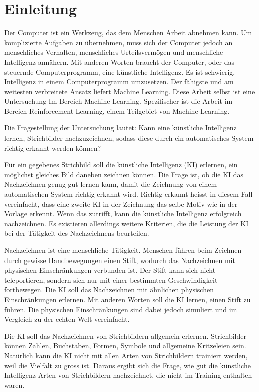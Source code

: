 \chapter{Einleitung}\label{chap:einleit}
Der Computer ist ein Werkzeug, das dem Menschen Arbeit abnehmen kann. Um
komplizierte Aufgaben zu übernehmen, muss sich der Computer jedoch an
menschliches Verhalten, menschliches Urteilsvermögen und menschliche Intelligenz
annähern. Mit anderen Worten braucht der Computer, oder das steuernde
Computerprogramm, eine künstliche Intelligenz. Es ist schwierig, Intelligenz in
einem Computerprogramm umzusetzen. Der fähigste und am weitesten verbreitete
Ansatz liefert Machine Learning. Diese Arbeit selbst ist eine Untersuchung Im
Bereich Machine Learning. Spezifischer ist die Arbeit im Bereich Reinforcement
Learning, einem Teilgebiet von Machine Learning.

Die Fragestellung der Untersuchung lautet: Kann eine künstliche Intelligenz
lernen, Strichbilder nachzuzeichnen, sodass diese durch ein automatisches System
richtig erkannt werden können?

Für ein gegebenes Strichbild soll die künstliche Intelligenz (KI) erlernen, ein
möglichst gleiches Bild daneben zeichnen können. Die Frage ist, ob die KI das
Nachzeichnen genug gut lernen kann, damit die Zeichnung von einem automatischen
System richtig erkannt wird. Richtig erkannt heisst in diesem Fall vereinfacht,
dass eine zweite KI in der Zeichnung das selbe Motiv wie in der Vorlage erkennt.
Wenn das zutrifft, kann die künstliche Intelligenz erfolgreich nachzeichnen. Es
existieren allerdings weitere Kriterien, die die Leistung der KI bei der
Tätigkeit des Nachzeichnens beurteilen.

Nachzeichnen ist eine menschliche Tätigkeit. Menschen führen beim Zeichnen durch
gewisse Handbewegungen einen Stift, wodurch das Nachzeichnen mit physischen
Einschränkungen verbunden ist. Der Stift kann sich nicht teleportieren, sondern
sich nur mit einer bestimmten Geschwindigkeit fortbewegen. Die KI soll das
Nachzeichnen mit ähnlichen physischen Einschränkungen erlernen. Mit anderen
Worten soll die KI lernen, einen Stift zu führen.  Die
physischen Einschränkungen sind dabei jedoch simuliert und im Vergleich zu der
echten Welt vereinfacht. 

Die KI soll das Nachzeichnen von Strichbildern allgemein erlernen. Strichbilder
können Zahlen, Buchstaben, Formen, Symbole und allgemeine Kritzeleien sein.
Natürlich kann die KI nicht mit allen Arten von Strichbildern trainiert werden,
weil die Vielfalt zu gross ist. Daraus ergibt sich die Frage, wie gut die
künstliche Intelligenz Arten von Strichbildern nachzeichnet, die nicht im
Training enthalten waren.

